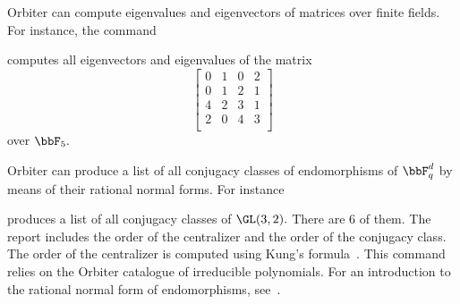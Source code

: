 \bigskip


Orbiter can compute eigenvalues and eigenvectors of matrices over finite fields. 
For instance, the command 
{\tt

}
computes all eigenvectors and eigenvalues of the matrix
$$
\left[
\begin{array}{cccc}
	0&1&0&2\\
	0&1&2&1\\
	4&2&3&1\\
	2&0&4&3\\
\end{array}
\right]
$$
over $\bbF_5.$

\bigskip

Orbiter can produce a list of all conjugacy classes 
of endomorphisms of $\bbF_q^d$ by means of their rational normal forms. 
For instance
{\tt

}
produces a list of all conjugacy classes of $\GL(3,2).$
There are 6 of them.
The report includes the order of the centralizer and the order of the conjugacy class. 
The order of the centralizer is computed using Kung's formula~\cite{Kung81}.
This command relies on the Orbiter catalogue of irreducible polynomials.
For an introduction to the rational normal form of endomorphisms, see~\cite{Lueneburg1987}.
